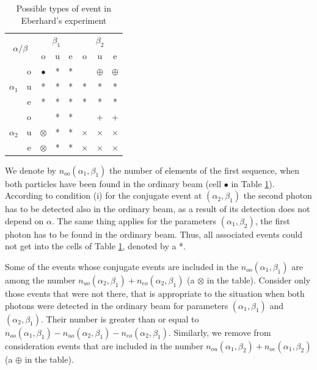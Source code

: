 \documentclass[%
master,         %
subf,           %
href,           %
colorlinks=true %
]{disser}
\numberwithin{equation}{section}
\numberwithin{figure}{section}
\begin{document}
\begin{table}
\centering
\begin{tabular}{|c|c|c|c|c|c|c|c|}
\hline 
\multicolumn{2}{|c|}{\multirow{2}{*}{$\alpha / \beta$}}  & \multicolumn{3}{c|}{$\beta_1$} & \multicolumn{3}{c|}{$\beta_2$} \\ 
\cline{3-8}
\multicolumn{2}{|c|}{}  & o & u & e & o & u & e \\ 
\hline 
\multirow{3}{*}{$\alpha_1$} & o & $\bullet$ & * & * &  & $\oplus$ & $\oplus$ \\ 
\cline{2-8}
 & u & * & * & * & * & * & * \\ 
\cline{2-8}
 & e & * & * & * & * & * & * \\ 
\hline 
\multirow{3}{*}{$\alpha_2$} & o &  & * & * &  & + & + \\ 
\cline{2-8}
 & u & $\otimes$ & * & * & $\times$ & $\times$ & $\times$ \\ 
\cline{2-8}
 & e & $\otimes$ & * & * & $\times$ & $\times$ & $\times$ \\ 
\hline 
\end{tabular} 
\caption{Possible types of event in Eberhard's experiment}
\label{tab:Eberhard_table}
\end{table}

We denote by $ n_{oo} (\alpha_1, \beta_1) $ the number of elements of the first sequence, when both particles have been found in the ordinary beam (cell $ \bullet $ in Table \ref{tab:Eberhard_table}). According to condition (i) for the conjugate event at $ (\alpha_2, \beta_1) $ the second photon has to be detected also in the ordinary beam, as a result of its detection does not depend on $ \alpha $. The same thing applies for the parameters $ (\alpha_1, \beta_2) $, the first photon has to be found in the ordinary beam. Thus, all associated events could not get into the cells of Table \ref{tab:Eberhard_table}, denoted by a *.

Some of the events whose conjugate events are included in the $ n_{oo} (\alpha_1, \beta_1) $ are among the number $ n_{uo} (\alpha_2, \beta_1) + n_ {eo} (\alpha_2, \beta_1) $ (a $ \otimes $ in the table). Consider only those events that were not there, that is appropriate to the situation when both photons were detected in the ordinary beam for parameters $ (\alpha_1, \beta_1) $ and $ (\alpha_2, \beta_1) $. Their number is greater than or equal to $ n_{oo} (\alpha_1, \beta_1) - n_{uo} (\alpha_2, \beta_1) - n_{eo} (\alpha_2, \beta_1) $. Similarly, we remove from consideration events that are included in the number $ n_{ou} (\alpha_1, \beta_2) + n_{oe} (\alpha_1, \beta_2) $ (a $ \oplus $ in the table).
\end{document}
